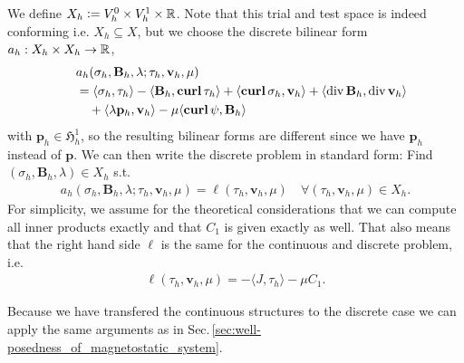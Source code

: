 \documentclass[../master_thesis.tex]{subfiles}
\begin{document}
We define $X_h \vcentcolon= V_h^0 \times V_h^1 \times \mathbb{R}$. 
Note that this trial and test space is indeed conforming i.e. $X_h \subseteq X$, 
but we choose the discrete bilinear form $a_h:X_h \times X_h \rightarrow \mathbb{R}$,
\begin{align*}
    &a_h(\sigma_h,\mathbf{B}_h,\lambda;\tau_h,\mathbf{v}_h,\mu)
    \\ \quad&= \langle \sigma_h, \tau_h \rangle - \langle \mathbf{B}_h, \veccurl\tau_h \rangle
    + \langle \veccurl\sigma_h, \mathbf{v}_h \rangle + \langle \diver \mathbf{B}_h, \diver \mathbf{v}_h \rangle 
    \\ &\quad+ \langle \lambda \mathbf{p}_h, \mathbf{v}_h \rangle - \mu \langle \veccurl \psi, \mathbf{B}_h \rangle
\end{align*} 
with $\mathbf{p}_h \in \mathfrak{H}^1_h$, 
so the resulting bilinear forms are different since we have $\mathbf{p}_h$ 
instead of $\mathbf{p}$. We can then write the discrete problem in 
standard form: Find $(\sigma_h,\mathbf{B}_h,\lambda) \in X_h$ s.t.
\begin{align*}
    a_h(\sigma_h,\mathbf{B}_h,\lambda;\tau_h,\mathbf{v}_h,\mu) = \ell(\tau_h,\mathbf{v}_h,\mu) 
    \quad \forall (\tau_h,\mathbf{v}_h,\mu) \in X_h.
\end{align*}
For simplicity, we assume for the theoretical considerations that we can 
compute all inner products exactly and that $C_1$ is 
given exactly as well. That also means that the right hand side $\ell$ is the 
same for the continuous and discrete problem, i.e. 
\begin{align*}
    \ell(\tau_h,\mathbf{v}_h,\mu) = -\langle J, \tau_h \rangle - \mu C_1.
\end{align*}

Because we have transfered the continuous structures to the discrete case 
we can apply the same arguments as in Sec.\,\ref{sec:well-posedness_of_magnetostatic_system}.
\end{document}
